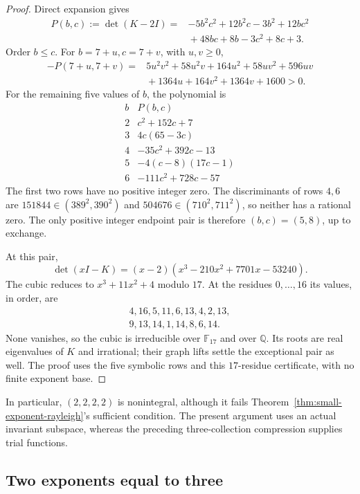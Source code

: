 \begin{proof}
Direct expansion gives
\begin{align*}
P(b,c):=\det(K-2I)={}&-5b^2c^2+12b^2c-3b^2+12bc^2\\
                    &{}+48bc+8b-3c^2+8c+3.
\end{align*}
Order $b\leq c$. For $b=7+u,c=7+v$, with $u,v\geq0$,
\begin{align*}
-P(7+u,7+v)={}&5u^2v^2+58u^2v+164u^2+58uv^2+596uv\\
              &{}+1364u+164v^2+1364v+1600>0.
\end{align*}
For the remaining five values of $b$, the polynomial is
\[
\begin{array}{c|l}
b&P(b,c)\\\hline
2&c^2+152c+7\\
3&4c(65-3c)\\
4&-35c^2+392c-13\\
5&-4(c-8)(17c-1)\\
6&-111c^2+728c-57
\end{array}
\]
The first two rows have no positive integer zero. The discriminants
of rows $4,6$ are $151844\in(389^2,390^2)$ and
$504676\in(710^2,711^2)$, so neither has a rational zero.
The only positive integer endpoint pair is therefore $(b,c)=(5,8)$,
up to exchange.

At this pair,
\[
\det(xI-K)=(x-2)(x^3-210x^2+7701x-53240).
\]
The cubic reduces to $x^3+11x^2+4$ modulo $17$. At the residues
$0,\ldots,16$ its values, in order, are
\[
\begin{gathered}
4,16,5,11,6,13,4,2,13,\\
9,13,14,1,14,8,6,14.
\end{gathered}
\]
None vanishes, so the cubic is irreducible over $\mathbb F_{17}$ and
over $\mathbb Q$. Its roots are real eigenvalues of $K$ and irrational;
their graph lifts settle the exceptional pair as well. The proof uses
the five symbolic rows and this $17$-residue certificate, with no
finite exponent base.
\end{proof}

In particular, $(2,2,2,2)$ is nonintegral, although it fails
Theorem~\ref{thm:small-exponent-rayleigh}'s sufficient condition.
The present argument uses an actual invariant subspace, whereas the
preceding three-collection compression supplies trial functions.

\subsection{Two exponents equal to three}

